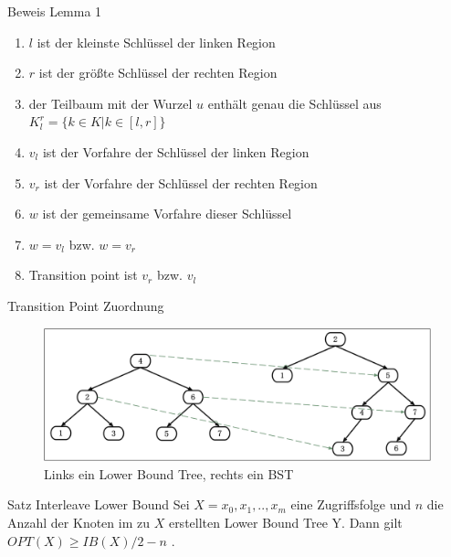 \documentclass[11pt]{beamer}
\begin{document}
\begin{frame} {Beweis Lemma 1}
	\begin{enumerate}
			\item  $l$	ist der kleinste Schlüssel der linken Region
		\item  $r$	ist der größte Schlüssel der rechten Region
		\pause
		\item der Teilbaum mit der Wurzel $u$ enthält genau die Schlüssel aus $K^r_l = \{k \in K \vert k \in \left[l,r\right]\}$
		\pause
		\item  $v_l$ ist der Vorfahre der Schlüssel der linken Region
		\item  $v_r$ ist der Vorfahre der Schlüssel der rechten Region
		\item  $w$ ist der gemeinsame Vorfahre dieser Schlüssel
		\item  $w = v_l$ bzw. $w = v_r$	
		\item  Transition point ist $v_r$ bzw. $v_l$ 
	\end{enumerate}	
\end{frame}
\begin{frame} {Transition Point Zuordnung}
	\begin{figure}[H]
		\centering
		\includegraphics[width=1\textwidth]{Medien/pres/transitionPoints}
		\caption{Links ein Lower Bound Tree, rechts ein BST }
	\end{figure}
\end{frame}

\begin{frame} {Satz Interleave Lower Bound}
		Sei $X = x_0, x_1,.., x_m$  eine Zugriffsfolge und $n$ die Anzahl der Knoten im zu $X$ erstellten Lower Bound Tree Y. Dann gilt\\	
	$\mathit{OPT}\left(X\right) \geq \mathit{IB}\left(X\right) /2 - n$ .
	
\end{frame}
\end{document}
